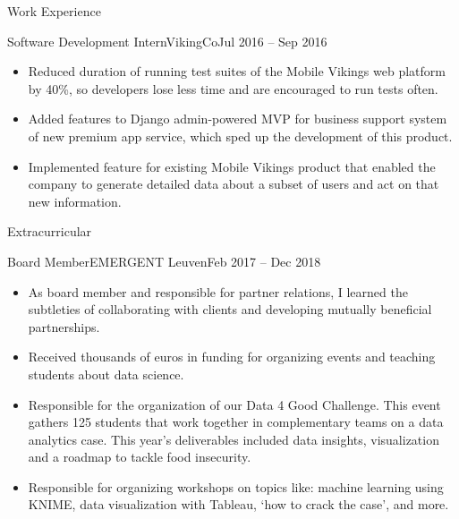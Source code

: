\documentclass[]{mcdowellcv}
\begin{document}
\begin{cvsection}{Work Experience}
\begin{cvsubsection}{Software Development Intern}{VikingCo}{Jul 2016 -- Sep 2016}
		\begin{itemize}%
			\item Reduced duration of running test suites of the Mobile Vikings web platform by 40\%, so developers lose less time and are encouraged to run tests often.
			\item Added features to \textquotedbl{}Django admin\textquotedbl{}-powered MVP for business support system of new premium app service, which sped up the development of this product.
			\item Implemented feature for existing Mobile Vikings product that enabled the company to generate detailed data about a subset of users and act on that new information.
		\end{itemize}
	\end{cvsubsection}
\end{cvsection}
\begin{cvsection}{Extracurricular}
	\begin{cvsubsection}{Board Member}{EMERGENT Leuven}{Feb 2017 -- Dec 2018}
		\begin{itemize}
			\item As board member and responsible for partner relations, I learned the subtleties of collaborating with clients and developing mutually beneficial partnerships. 
			\item Received thousands of euros in funding for organizing events and teaching students about data science.
			\item Responsible for the organization of our Data 4 Good Challenge. This event gathers 125 students that work together in complementary teams on a data analytics case. This year’s deliverables included data insights, visualization and a roadmap to tackle food insecurity.
			\item Responsible for organizing workshops on topics like: machine learning using KNIME, data visualization with Tableau, `how to crack the case', and more.
		\end{itemize}
	\end{cvsubsection}
\end{cvsection}
\end{document}
